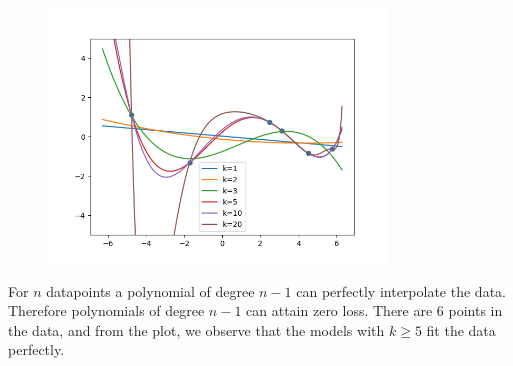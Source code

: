 \begin{answer}
\begin{figure}[H]
    \centering
    \includegraphics[width=9cm]{featuremaps/overfitting.png}
\end{figure}
For $n$ datapoints a polynomial of degree $n-1$ can perfectly interpolate the data. Therefore polynomials of degree $n-1$ can attain zero loss. There are 6 points in the data, and from the plot, we observe that the models with $k\ge 5$ fit the data perfectly.
\end{answer}
